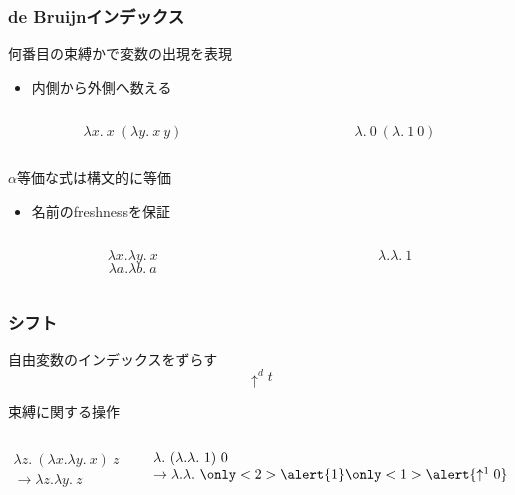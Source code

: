 \documentclass[dvipdfmx,cjk,xcolor=dvipsnames,envcountsect,notheorems,12pt]{beamer}
\theoremstyle{definition}
\begin{document}
\begin{frame}
	\frametitle{de Bruijnインデックス}
	\LARGE
	何番目の束縛かで変数の出現を表現
	\begin{itemize}
		\item 内側から外側へ数える
	\end{itemize}
	\begin{columns}
		\begin{column}{0.5\textwidth}
			\[ \lambda x.~x~(\lambda y.~x~y) \]
		\end{column}
		\begin{column}{0.5\textwidth}
			\[ \lambda.~0~(\lambda.~1~0) \]
		\end{column}
	\end{columns}

	\vfill

	$\alpha$等価な式は構文的に等価
	\begin{itemize}
		\item 名前のfreshnessを保証
	\end{itemize}
	\begin{columns}
		\begin{column}{0.5\textwidth}
			\[ \lambda x.\lambda y.~x \]
			\[ \lambda a.\lambda b.~a \]
		\end{column}
		\begin{column}{0.5\textwidth}
			\[ \lambda.\lambda.~1 \]
		\end{column}
	\end{columns}
\end{frame}

\begin{frame}
	\frametitle{シフト}
	\LARGE 自由変数のインデックスをずらす
	\[\uparrow^d t \]

	束縛に関する操作

	\vfill

	{\large \begin{columns}
		\begin{column}{0.5\textwidth}
			\centering
			$\begin{array}{l}
				\lambda z.~(\lambda x.\lambda y.~x)~z \\
				\rightarrow \lambda z.\lambda y.~z
			\end{array}$
		\end{column}
		\begin{column}{0.5\textwidth}
			\centering
			$\begin{array}{l}
				\lambda.~(\lambda.\lambda.~1)~0\\
				\rightarrow \lambda.\lambda.~\only<2>{\alert{1}}\only<1>{\alert{\uparrow^1 0}}
			\end{array}$
		\end{column}
	\end{columns}}
	\pause
\end{frame}
\end{document}
